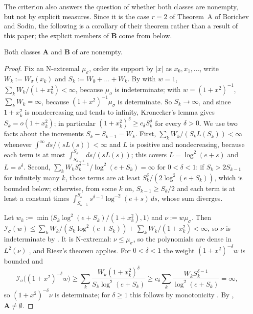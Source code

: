 The criterion also answers the question of \cite{BergSzwarc2026} whether both classes are nonempty,
but not by explicit measures. Since it is the case $r=2$ of Theorem~A of Borichev and Sodin, the
following is a corollary of their theorem rather than a result of this paper; the explicit members of
$\mathbf B$ come from  below.

\begin{corollary}\label{cor:AB}
Both classes $\mathbf A$ and $\mathbf B$ of \cite{BergSzwarc2026} are nonempty.
\end{corollary}

\begin{proof}
Fix an N-extremal $\mu_\sigma$, order its support by $|x|$ as $x_0,x_1,\dots$, write $W_k:=W_\sigma(x_k)$ and
$S_k:=W_0+\dots+W_k$. By  with $w=1$, $\sum_kW_k/(1+x_k^2)<\infty$, because $\mu_\sigma$
is indeterminate; with $w=(1+x^2)^{-1}$, $\sum_kW_k=\infty$, because $(1+x^2)^{-1}\mu_\sigma$ is determinate.
So $S_k\to\infty$, and since $1+x_k^2$ is nondecreasing and tends to infinity, Kronecker's lemma gives
$S_k=o(1+x_k^2)$; in particular $(1+x_k^2)^\delta\ge c_\delta S_k^\delta$ for every $\delta>0$. We use two facts about
the increments $S_k-S_{k-1}=W_k$. First, $\sum_kW_k/(S_kL(S_k))<\infty$ whenever $\int^\infty ds/(sL(s))<\infty$ and
$L$ is positive and nondecreasing, because each term is at most $\int_{S_{k-1}}^{S_k}ds/(sL(s))$; this
covers $L=\log^2(e+s)$ and $L=s^\delta$. Second, $\sum_kW_kS_k^{\delta-1}/\log^2(e+S_k)=\infty$ for
$0<\delta<1$: if $S_k>2S_{k-1}$ for infinitely many $k$, those terms are at least
$S_k^\delta/(2\log^2(e+S_k))$, which is bounded below; otherwise, from some $k$ on, $S_{k-1}\ge S_k/2$ and each
term is at least a constant times $\int_{S_{k-1}}^{S_k}s^{\delta-1}\log^{-2}(e+s)\,ds$, whose sum diverges.

 Let $w_k:=\min\bigl(S_k\log^2(e+S_k)/(1+x_k^2),1\bigr)$ and $\nu:=w\mu_\sigma$. Then
$\mathcal I_\sigma(w)\le\sum_kW_k/(S_k\log^2(e+S_k))+\sum_kW_k/(1+x_k^2)<\infty$, so $\nu$ is indeterminate by
. It is N-extremal: $\nu\le\mu_\sigma$, so the polynomials are dense in $L^2(\nu)$
\cite[Lemma~1.1(ii)]{BergSzwarc2026}, and Riesz's theorem applies. For $0<\delta<1$ the weight
$(1+x^2)^{-\delta}w$ is bounded and
\[
  \mathcal I_\sigma\bigl((1+x^2)^{-\delta}w\bigr)\ge\sum_k\frac{W_k(1+x_k^2)^\delta}{S_k\log^2(e+S_k)}
  \ge c_\delta\sum_k\frac{W_kS_k^{\delta-1}}{\log^2(e+S_k)}=\infty,
\]
so $(1+x^2)^{-\delta}\nu$ is determinate; for $\delta\ge1$ this follows by monotonicity
\cite[Lemma~1.1(i)]{BergSzwarc2026}. By \cite[Prop.~1.7(i)]{BergSzwarc2026}, $\mathbf A\ne\emptyset$.


\end{proof}
